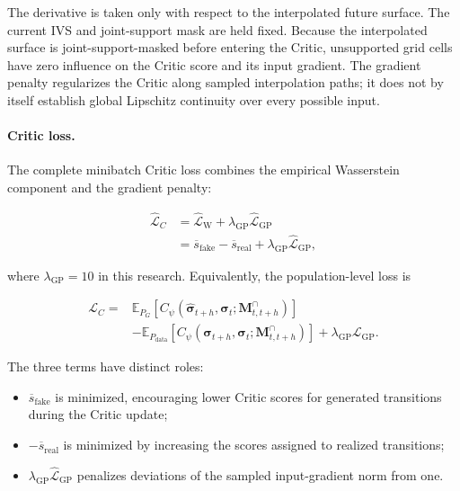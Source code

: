 The derivative is taken only with respect to the interpolated future surface.
The current IVS and joint-support mask are held fixed. Because the
interpolated surface is joint-support-masked before entering the Critic,
unsupported grid cells have zero influence on the Critic score and its input
gradient. The gradient penalty regularizes the Critic along sampled
interpolation paths; it does not by itself establish global Lipschitz
continuity over every possible input.


\paragraph*{Critic loss.}
The complete minibatch Critic loss combines the empirical Wasserstein
component and the gradient penalty:

\begin{align}
\widehat{\mathcal{L}}_{C}
&=
\widehat{\mathcal{L}}_{\mathrm{W}}
+
\lambda_{\mathrm{GP}}
\widehat{\mathcal{L}}_{\mathrm{GP}}
\nonumber\\
&=
\overline{s}_{\mathrm{fake}}
-
\overline{s}_{\mathrm{real}}
+
\lambda_{\mathrm{GP}}
\widehat{\mathcal{L}}_{\mathrm{GP}},
\label{eq:ch3:wgan_loss}
\end{align}

where $\lambda_{\mathrm{GP}}=10$ in this research. Equivalently, the
population-level loss is

\begin{align}
\mathcal{L}_{C}
={}&
\mathbb{E}_{P_G}
\left[
C_{\psi}
\left(
\widehat{\boldsymbol{\sigma}}_{t+h},
\boldsymbol{\sigma}_t;
\mathbf{M}^{\cap}_{t,t+h}
\right)
\right]
\nonumber\\
&-
\mathbb{E}_{P_{\mathrm{data}}}
\left[
C_{\psi}
\left(
\boldsymbol{\sigma}_{t+h},
\boldsymbol{\sigma}_t;
\mathbf{M}^{\cap}_{t,t+h}
\right)
\right]
+
\lambda_{\mathrm{GP}}
\mathcal{L}_{\mathrm{GP}}.
\end{align}

The three terms have distinct roles:

\begin{itemize}
    \item
    $\overline{s}_{\mathrm{fake}}$ is minimized, encouraging lower Critic
    scores for generated transitions during the Critic update;
    \item
    $-\overline{s}_{\mathrm{real}}$ is minimized by increasing the scores
    assigned to realized transitions;
    \item
    $\lambda_{\mathrm{GP}}\widehat{\mathcal{L}}_{\mathrm{GP}}$ penalizes
    deviations of the sampled input-gradient norm from one.
\end{itemize}

